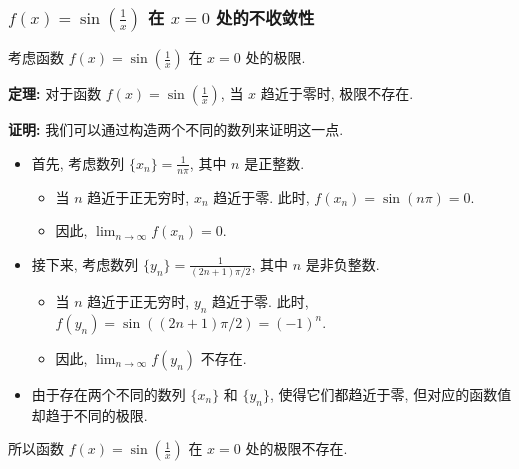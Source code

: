 \documentclass[
10pt, 
aspectratio=43, 
]{beamer}
\begin{document}
\begin{frame}
	\frametitle{$f(x) = \sin\left(\frac{1}{x}\right)$ 在 $x=0$ 处的不收敛性}
	
	考虑函数 $f(x) = \sin\left(\frac{1}{x}\right)$ 在 $x=0$ 处的极限. 
	
	\pause
	
	\textbf{定理: } 对于函数 $f(x) = \sin\left(\frac{1}{x}\right)$, 当 $x$ 趋近于零时, 极限不存在. 
	
	\pause
	
	\textbf{证明: } 
	我们可以通过构造两个不同的数列来证明这一点. 
	
	\pause
	
	\begin{itemize}
		
		\item 首先, 考虑数列 $\{x_n\} = \frac{1}{n\pi}$, 其中 $n$ 是正整数. 
		      
		      \pause
		      \begin{itemize}
		      	\item 当 $n$ 趋近于正无穷时, $x_n$ 趋近于零. 此时, $f(x_n) = \sin(n\pi) = 0$. 
		      	      
		      	      \pause
		      	      
		      	\item 因此, $\lim_{n \to \infty} f(x_n) = 0$. 
		      \end{itemize}
		      \pause
		      
		\item 接下来, 考虑数列 $\{y_n\} = \frac{1}{(2n+1)\pi/2}$, 其中 $n$ 是非负整数. 
		      
		      \pause
		      \begin{itemize}
		      	\item 当 $n$ 趋近于正无穷时, $y_n$ 趋近于零. 此时, $f(y_n) = \sin((2n+1)\pi/2) = (-1)^n$. 
		      	      
		      	      \pause
		      	      
		      	\item 因此, $\lim_{n \to \infty} f(y_n)$ 不存在. 
		      	      
		      	      
		      \end{itemize}
		      
		      \pause
		      
		\item 由于存在两个不同的数列 $\{x_n\}$ 和 $\{y_n\}$, 使得它们都趋近于零, 但对应的函数值却趋于不同的极限.
		      
	\end{itemize}
	\pause
	所以函数 $f(x) = \sin\left(\frac{1}{x}\right)$ 在 $x=0$ 处的极限不存在. 
\end{frame}
\end{document}
